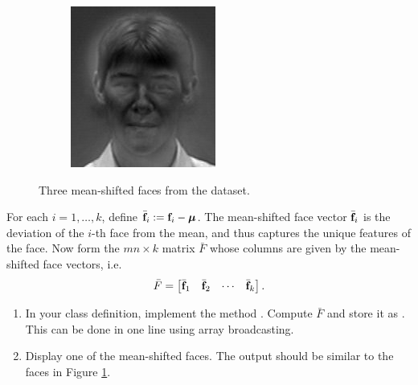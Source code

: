 \begin{figure}
\begin{subfigure}[b]{0.3\textwidth}
\end{subfigure}
\begin{subfigure}[b]{0.3\textwidth}
\includegraphics[width=\textwidth]{figures/differenceFace2.png}
\end{subfigure}
\caption{Three mean-shifted faces from the dataset.}
\label{facialRecognition:differenceFaces}
\end{figure}
For each $i = 1,\ldots, k$, define $\bar{\mathbf{f}}_i := \mathbf{f}_i - {\boldsymbol \mu}$.
The mean-shifted face vector $\bar{\mathbf{f}}_i$ is the deviation of the $i$-th face from the mean, and thus captures the unique features of the face.
Now form the $mn \times k$ matrix $\bar{F}$ whose columns are given by the mean-shifted face vectors, i.e.
\[
\bar{F} = \begin{bmatrix}
\bar{\mathbf{f}}_1 & \bar{\mathbf{f}}_2 & \cdots & \bar{\mathbf{f}}_k
\end{bmatrix}.
\]
\begin{problem}
\leavevmode
\begin{enumerate}
\item In your class definition, implement the method .
Compute $\bar{F}$ and store it as .
This can be done in one line using array broadcasting.
\item
Display one of the mean-shifted faces.
The output should be similar to the faces in Figure \ref{facialRecognition:differenceFaces}.
\end{enumerate}
\end{problem}


